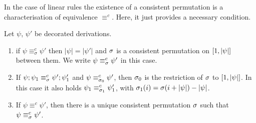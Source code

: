 {\begin{definition}
\end{definition}

In the case of linear rules the existence of a consistent permutation
is a characterisation of equivalence $\equiv^c$. Here, it just
provides a necessary condition.

\begin{lemma}
\label{le:consistent_permutations}
Let $\psi$, $\psi'$ be decorated derivations. 
\begin{enumerate}
\item if $\psi \equiv^c_\sigma \psi'$ then
$|\psi| = |\psi'|$ and $\sigma$ is a consistent permutation on 
$[{1},{|\psi|}]$ between them. We write  $\psi \equiv^{c}_\sigma \psi'$ in this case.
\item If $\psi; \psi_1  \equiv^{c}_\sigma \psi'; \psi'_1$ and $\psi  \equiv^{c}_{\sigma_0} \psi'$, 
then $\sigma_0$ is the restriction of $\sigma$ to $[{1},{|\psi|}]$. In this case it also holds
$\psi_1  \equiv^{c}_{\sigma_1} \psi'_1$, with $\sigma_1(i) = \sigma(i + |\psi|) -  |\psi|$.
\item
If $\psi \equiv^{c} \psi'$, then there is a unique consistent permutation $\sigma$ such that 
$\psi \equiv^{c}_\sigma \psi'$.
\end{enumerate}
\end{lemma}
} %

